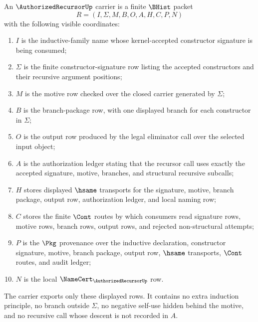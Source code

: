 \begin{definition}
\label{def:authorized-recursor-carrier}
An $\AuthorizedRecursorUp$ carrier is a finite $\BHist$ packet
$$
R=(I,\Sigma,M,B,O,A,H,C,P,N)
$$
with the following visible coordinates:
\begin{enumerate}
\item $I$ is the inductive-family name whose kernel-accepted constructor signature is being consumed;
\item $\Sigma$ is the finite constructor-signature row listing the accepted constructors and their recursive argument positions;
\item $M$ is the motive row checked over the closed carrier generated by $\Sigma$;
\item $B$ is the branch-package row, with one displayed branch for each constructor in $\Sigma$;
\item $O$ is the output row produced by the legal eliminator call over the selected input object;
\item $A$ is the authorization ledger stating that the recursor call uses exactly the accepted signature, motive, branches, and structural recursive subcalls;
\item $H$ stores displayed $\hsame$ transports for the signature, motive, branch package, output row, authorization ledger, and local naming row;
\item $C$ stores the finite $\Cont$ routes by which consumers read signature rows, motive rows, branch rows, output rows, and rejected non-structural attempts;
\item $P$ is the $\Pkg$ provenance over the inductive declaration, constructor signature, motive, branch package, output row, $\hsame$ transports, $\Cont$ routes, and audit ledger;
\item $N$ is the local $\NameCert_{\AuthorizedRecursorUp}$ row.
\end{enumerate}
The carrier exports only these displayed rows. It contains no extra induction principle, no branch outside $\Sigma$, no negative self-use hidden behind the motive, and no recursive call whose descent is not recorded in $A$.
\end{definition}

